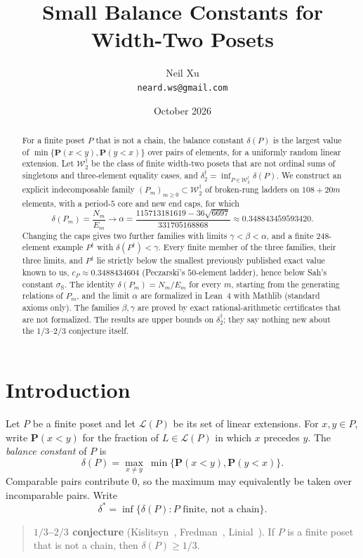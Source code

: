\documentclass[11pt]{amsart}
\title[Small balance constants for width-two posets]{Small Balance Constants for Width-Two Posets}
\author[Neil Xu]{Neil Xu\\[2pt]{\normalfont\small\texttt{\lowercase{neard.ws@gmail.com}}}}
\date{October 2026}
\theoremstyle{definition}
\theoremstyle{remark}
\newcommand{\Lin}{\mathcal{L}}
\newcommand{\Prob}{\mathbf{P}}
\newcommand{\Wdag}{\mathcal{W}_2^{\dagger}}
\newcommand{\deltadag}{\delta_2^{\dagger}}
\begin{document}
\begin{abstract}
For a finite poset $P$ that is not a chain, the balance constant $\delta(P)$ is the largest value of $\min\{\Prob(x<y),\Prob(y<x)\}$ over pairs of elements, for a uniformly random linear extension. Let $\Wdag$ be the class of finite width-two posets that are not ordinal sums of singletons and three-element equality cases, and $\deltadag=\inf_{P\in\Wdag}\delta(P)$. We construct an explicit indecomposable family $(P_m)_{m\ge0}\subset\Wdag$ of broken-rung ladders on $108+20m$ elements, with a period-$5$ core and new end caps, for which
\[
\delta(P_m)=\frac{N_m}{E_m}\longrightarrow \alpha=\frac{115713181619-36\sqrt{6697}}{331705168868}\approx 0.348843459593420.
\]
Changing the caps gives two further families with limits $\gamma<\beta<\alpha$, and a finite $248$-element example $P^\dagger$ with $\delta(P^\dagger)<\gamma$. Every finite member of the three families, their three limits, and $P^\dagger$ lie strictly below the smallest previously published exact value known to us, $c_P\approx0.3488434604$ (Peczarski's $50$-element ladder), hence below Sah's constant $\sigma_{\mathrm S}$. The identity $\delta(P_m)=N_m/E_m$ for every $m$, starting from the generating relations of $P_m$, and the limit $\alpha$ are formalized in Lean~4 with Mathlib (standard axioms only). The families $\beta,\gamma$ are proved by exact rational-arithmetic certificates that are not formalized. The results are upper bounds on $\deltadag$; they say nothing new about the $1/3$--$2/3$ conjecture itself.
\end{abstract}

\maketitle

\section{Introduction}

Let $P$ be a finite poset and let $\Lin(P)$ be its set of linear extensions. For $x,y\in P$, write $\Prob(x<y)$ for the fraction of $L\in\Lin(P)$ in which $x$ precedes $y$. The \emph{balance constant} of $P$ is
\[
\delta(P)=\max_{x\neq y}\ \min\{\Prob(x<y),\Prob(y<x)\}.
\]
Comparable pairs contribute $0$, so the maximum may equivalently be taken over incomparable pairs. Write
\[
\delta^*=\inf\{\delta(P): P \text{ finite, not a chain}\}.
\]

\begin{quote}
\textbf{$1/3$--$2/3$ conjecture} (Kislitsyn~\cite{Kis68}, Fredman~\cite{Fre76}, Linial~\cite{Lin84}). If $P$ is a finite poset that is not a chain, then $\delta(P)\ge 1/3$.
\end{quote}
\end{document}
